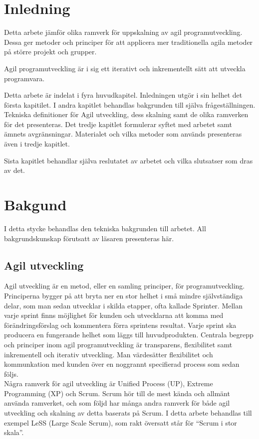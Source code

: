 \section{Inledning}
	
	Detta arbete jämför olika ramverk för uppskalning av agil programutveckling. Dessa ger metoder och principer för att applicera mer traditionella agila metoder på större projekt och grupper.
	
	Agil programutveckling är i sig ett iterativt och inkrementellt sätt att utveckla programvara.
	
	Detta arbete är indelat i fyra huvudkapitel. Inledningen utgör i sin helhet det första kapitilet.
	I andra kapitlet behandlas bakgrunden till själva frågeställningen. Tekniska definitioner för Agil utveckling, dess skalning samt de olika ramverken för det presenteras. 
	Det tredje kapitlet formulerar syftet med arbetet samt ämnets avgränsningar. Materialet och vilka metoder som används presenteras även i tredje kapitlet.
	
	Sista kapitlet behandlar själva reslutatet av arbetet och vilka slutsatser som dras av det.
	
\newpage
\section{Bakgund} 	
	
	
	I detta stycke behandlas den tekniska bakgrunden till arbetet. All bakgrundskunskap förutsatt av läsaren presenteras här.
	
	\subsection{Agil utveckling}
	
		Agil utveckling är en metod, eller en samling principer, för programutveckling. Principerna bygger på att bryta ner en stor helhet i små mindre självständiga delar, som man sedan utvecklar i skilda etapper, ofta kallade Sprinter.
		Mellan varje sprint finns möjlighet för kunden och utvecklarna att komma med förändringsförslag och kommentera förra sprintens resultat. Varje sprint ska producera en fungerande helhet som läggs till huvudprodukten. Centrala begrepp och principer inom agil programutveckling är transparens, flexibilitet samt inkrementell och iterativ utveckling. Man värdesätter flexibilitet och kommunkation med kunden över en noggrannt specifierad process som sedan följs. \cite{agile_manifesto}
		\\
		Några ramverk för agil utveckling är Unified Process (UP), Extreme Programming (XP) och Scrum.
		Scrum hör till de mest kända och allmänt använda ramverket, och som följd har många andra ramverk för både agil utveckling och skalning av detta baserats på Scrum. I detta arbete behandlas till exempel LeSS (Large Scale Scrum), som rakt översatt står för ``Scrum i stor skala''.
		
